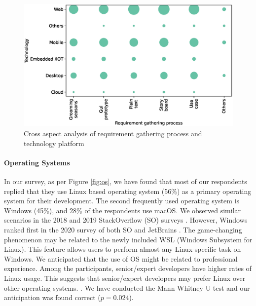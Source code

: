 \begin{figure}[h]
\centering
  \includegraphics[scale=0.47]{Figures/Requirement_Technology_Cross_Analysis.eps}
  \caption{Cross aspect analysis of requirement gathering process and technology platform}
  \label{fig:requirement technology cross analysis}
\end{figure}



\paragraph{Operating Systems}
In our survey, as per Figure \ref{fig:os}, we have found that most of our respondents replied that they use Linux based operating system (56\%) as a primary operating system for their development. The second frequently used operating system is Windows (45\%), and 28\% of the respondents use macOS. We observed similar scenarios in the 2018 and 2019 StackOverflow (SO) surveys \cite{StackoverflowSurvey2018,StackoverflowSurvey2019}. However, Windows ranked first in the 2020 survey of both SO and JetBrains \cite{StackoverflowSurvey2020, JetBrains2020}. The game-changing phenomenon may be related to the newly included WSL (Windows Subsystem for Linux). This feature allows users to perform almost any Linux-specific task on Windows. We anticipated that the use of OS might be related to professional experience. Among the participants, senior/expert developers have higher rates of Linux usage. This suggests that senior/expert developers may prefer Linux over other operating systems. . We have conducted the Mann Whitney U test and our anticipation was found correct ($p=0.024$). %

